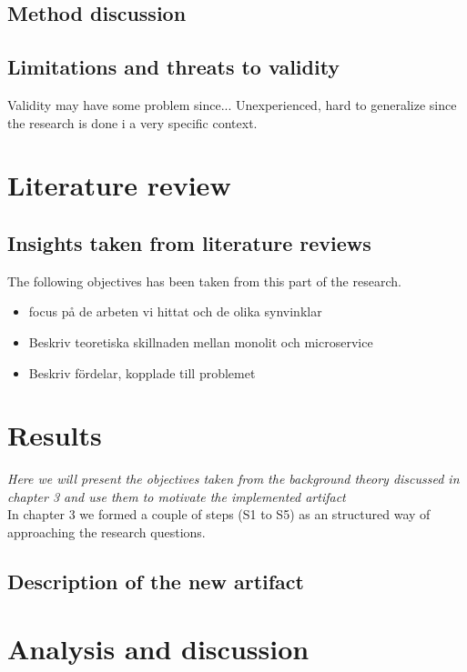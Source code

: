 \documentclass[a4paper,12pt]{article} %
\begin{document}
\subsection{Method discussion}

\subsection{Limitations and threats to validity}
Validity may have some problem since...
Unexperienced, hard to generalize since the research is done i a very specific context.


\section{Literature review}

\subsection{Insights taken from literature reviews}
The following objectives has been taken from this part of the research.
\begin{itemize}
\item focus på de arbeten vi hittat och de olika synvinklar
\item Beskriv teoretiska skillnaden mellan monolit och microservice
\item Beskriv fördelar, kopplade till problemet\cite{VaishnaviDESIGNSYSTEMS}
\end{itemize}

\newpage
\section{Results}
\emph{Here we will present the objectives taken from the background theory discussed in chapter 3 and use them to motivate the implemented artifact}\\
In chapter 3 we formed a couple of steps (S1 to S5) as an structured way of approaching the research questions.

\subsection{Description of the new artifact}

\newpage
\section{Analysis and discussion}
\end{document}
